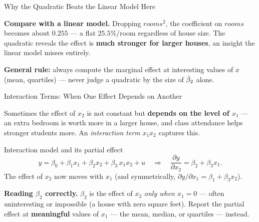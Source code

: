 \documentclass[aspectratio=169, 12pt]{beamer}
\begin{document}
\begin{frame}{Why the Quadratic Beats the Linear Model Here}

  \begin{keybox}
    \textbf{Compare with a linear model.} Dropping $rooms^2$, the coefficient on $rooms$
    becomes about $0.255$ --- a flat $25.5\%$/room regardless of house size. The
    quadratic reveals the effect is \textbf{much stronger for larger houses}, an insight
    the linear model misses entirely.
  \end{keybox}

  \medskip

  \textbf{General rule:} always compute the marginal effect at interesting values of $x$
  (mean, quartiles) --- never judge a quadratic by the size of $\hat{\beta}_2$ alone.

\end{frame}

\begin{frame}[shrink=8]{Interaction Terms: When One Effect Depends on Another}

  Sometimes the effect of $x_2$ is not constant but \textbf{depends on the level of
  $x_1$} --- an extra bedroom is worth more in a larger house, and class attendance
  helps stronger students more. An \emph{interaction term} $x_1 x_2$ captures this.

  \begin{definitionbox}{Interaction model and its partial effect}
    \[
      y = \beta_0 + \beta_1 x_1 + \beta_2 x_2 + \beta_3\, x_1 x_2 + u
      \quad\Longrightarrow\quad
      \frac{\partial y}{\partial x_2} = \beta_2 + \beta_3 x_1 .
    \]
    The effect of $x_2$ now moves with $x_1$ (and symmetrically,
    $\partial y/\partial x_1 = \beta_1 + \beta_3 x_2$).
  \end{definitionbox}

  \begin{keybox}
    \textbf{Reading $\beta_2$ correctly.} $\beta_2$ is the effect of $x_2$ \emph{only
    when $x_1 = 0$} --- often uninteresting or impossible (a house with zero square
    feet). Report the partial effect at \textbf{meaningful} values of $x_1$ --- the
    mean, median, or quartiles --- instead.
  \end{keybox}

\end{frame}
\end{document}
